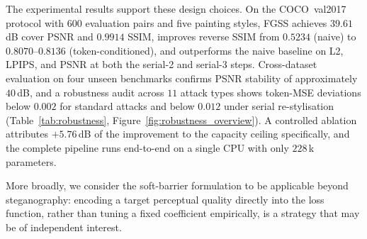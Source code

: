 \documentclass[conference]{IEEEtran}
\begin{document}
The experimental results support these design choices. On the COCO~val2017 protocol with $600$ evaluation pairs and five painting styles, FGSS achieves $39.61$\,dB cover PSNR and $0.9914$ SSIM, improves reverse SSIM from $0.5234$ (naive) to $0.8070$--$0.8136$ (token-conditioned), and outperforms the naive baseline on L2, LPIPS, and PSNR at both the serial-2 and serial-3 steps. Cross-dataset evaluation on four unseen benchmarks confirms PSNR stability of approximately $40$\,dB, and a robustness audit across $11$ attack types shows token-MSE deviations below $0.002$ for standard attacks and below $0.012$ under serial re-stylisation (Table~\ref{tab:robustness}, Figure~\ref{fig:robustness_overview}). A controlled ablation attributes $+5.76$\,dB of the improvement to the capacity ceiling specifically, and the complete pipeline runs end-to-end on a single CPU with only $228$\,k parameters.

More broadly, we consider the soft-barrier formulation to be applicable beyond steganography: encoding a target perceptual quality directly into the loss function, rather than tuning a fixed coefficient empirically, is a strategy that may be of independent interest.
\end{document}
